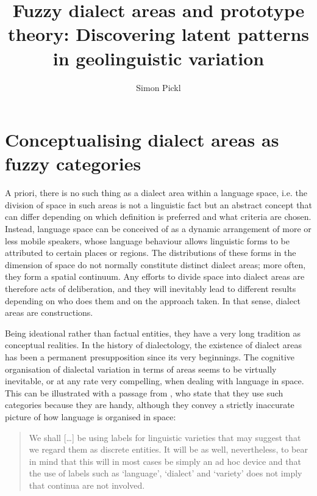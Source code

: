 \documentclass[output=paper]{LSP/langsci}
\author{Simon Pickl\affiliation{Universität Salzburg, Fachbereich Germanistik}}
\title{Fuzzy dialect areas and prototype theory: Discovering latent patterns in geolinguistic variation}
\begin{document}
 
 
  
\section{Conceptualising dialect areas as fuzzy categories}

A priori, there is no such thing as a dialect area within a language space, i.e. the division of space in such areas is not a linguistic fact but an abstract concept that can differ depending on which definition is preferred and what criteria are chosen. Instead, language space can be conceived of as a dynamic arrangement of more or less mobile speakers, whose language behaviour allows linguistic forms to be attributed to certain places or regions. The distributions of these forms in the dimension of space do not normally constitute distinct dialect areas; more often, they form a spatial continuum. Any efforts to divide space into dialect areas are therefore acts of deliberation, and they will inevitably lead to different results depending on who does them and on the approach taken. In that sense, dialect areas are constructions.

Being ideational rather than factual entities, they have a very long tradition as conceptual realities. In the history of dialectology, the existence of dialect areas has been a permanent presupposition since its very beginnings. The cognitive organisation of dialectal variation in terms of areas seems to be virtually inevitable, or at any rate very compelling, when dealing with language in space. This can be illustrated with a passage from \citet{chambers_dialectology_1998}, who state that they use such categories because they are handy, although they convey a strictly inaccurate picture of how language is organised in space:

\begin{quote}
We shall […] be using labels for linguistic varieties that may suggest that we regard them as discrete entities. It will be as well, nevertheless, to bear in mind that this will in most cases be simply an ad hoc device and that the use of labels such as ‘language’, ‘dialect’ and ‘variety’ does not imply that continua are not involved.\\
\citep[12]{chambers_dialectology_1998}
\end{quote}
\end{document}
